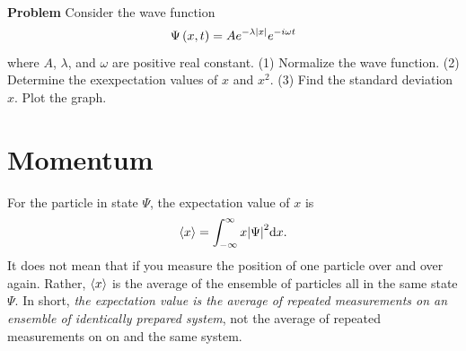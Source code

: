 \begin{fullwidth}
  \hrulefill\\
  \textbf{Problem} Consider the wave function
  \begin{equation}
   \Psi \left( x,t \right) = A e^{-\lambda \abs{x}} e^{-i\omega t} \nonumber
  \end{equation}
  where $A$, $\lambda$, and $\omega$ are positive real constant.
  (1) Normalize the wave function. (2) Determine the exexpectation values of $x$ and $x^{2}$. (3) Find the standard deviation $x$. Plot the graph.
  \\ \hrulefill
\end{fullwidth}

\section{Momentum}
For the particle in state $\Psi$, the expectation value of $x$ is
\begin{equation}
  \label{eq:1-10}
  \expval{x} = \int_{-\infty}^{\infty} x \abs{\Psi}^{2} \dd x.
\end{equation}
It does not mean that if you measure the position of one particle over and over again.
Rather, $\expval{x}$ is the average of the ensemble of particles all in the same state $\Psi$.
In short, \textit{the expectation value is the average of repeated measurements on an ensemble of identically prepared system}, not the average of repeated measurements on on and the same system.

